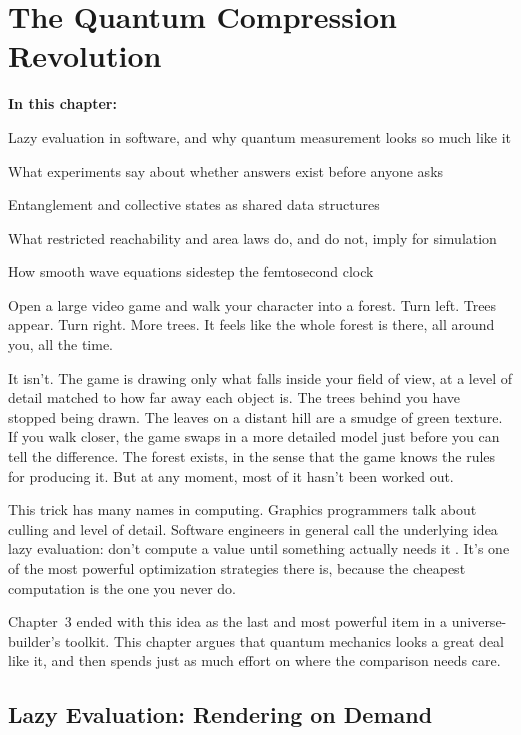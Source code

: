 \chapter{The Quantum Compression Revolution}

\begin{chaptermapbox}
\textbf{In this chapter:}
\begin{compactchecklist}
\item Lazy evaluation in software, and why quantum measurement looks so much like it
\item What experiments say about whether answers exist before anyone asks
\item Entanglement and collective states as shared data structures
\item What restricted reachability and area laws do, and do not, imply for simulation
\item How smooth wave equations sidestep the femtosecond clock
\end{compactchecklist}
\end{chaptermapbox}

Open a large video game and walk your character into a forest. Turn left. Trees appear. Turn right. More trees. It feels like the whole forest is there, all around you, all the time.

It isn't. The game is drawing only what falls inside your field of view, at a level of detail matched to how far away each object is. The trees behind you have stopped being drawn. The leaves on a distant hill are a smudge of green texture. If you walk closer, the game swaps in a more detailed model just before you can tell the difference. The forest exists, in the sense that the game knows the rules for producing it. But at any moment, most of it hasn't been worked out.

This trick has many names in computing. Graphics programmers talk about culling and level of detail. Software engineers in general call the underlying idea lazy evaluation: don't compute a value until something actually needs it \cite{henderson1976}. It's one of the most powerful optimization strategies there is, because the cheapest computation is the one you never do.

Chapter~3 ended with this idea as the last and most powerful item in a universe-builder's toolkit. This chapter argues that quantum mechanics looks a great deal like it, and then spends just as much effort on where the comparison needs care.

\section{Lazy Evaluation: Rendering on Demand}

